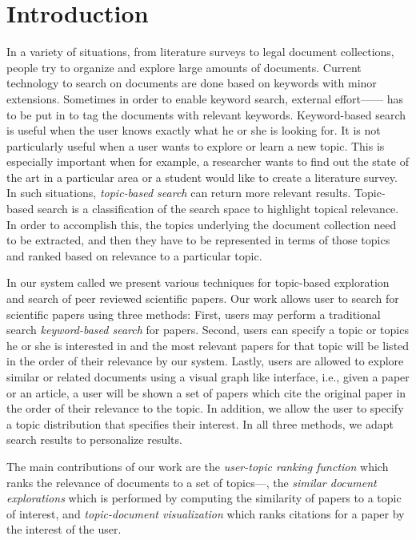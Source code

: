 \section{Introduction}

In a variety of situations, from literature surveys to legal 
document collections, people try to organize and explore large 
amounts of documents. Current technology to search on documents are 
done based on keywords with minor extensions. Sometimes in order to 
enable keyword search, external effort------ has to be put in to tag the 
documents with relevant keywords. Keyword-based search is useful when the 
user knows exactly what he or she is looking for. It is not 
particularly useful when a user wants to explore or learn a new 
topic. This is especially important when for example, a researcher 
wants to find out the state of the art in a particular area or a 
student would like to create a literature survey. In such situations, 
\textsl{topic-based search} can return more relevant results. 
Topic-based search is a classification of the search space to 
highlight topical relevance. In order to accomplish this, the topics 
underlying the document collection need to be extracted, and then 
they have to be represented in terms of those topics and ranked 
based on relevance to a particular topic. 

In our system called 
\system we present various techniques for topic-based exploration 
and search of peer reviewed scientific papers. Our work allows user 
to search for scientific papers using three methods: First, users 
may perform a traditional search \textsl{keyword-based search} for 
papers. Second, users can specify a topic or topics he or she is 
interested in and the most relevant papers for that topic will be 
listed in the order of their relevance by our system. Lastly, users 
are allowed to explore similar or related documents using a visual 
graph like interface, i.e., given a paper or an article, a user will 
be shown a set of papers which cite the original paper in the order 
of their relevance to the topic. In addition, we allow the user to 
specify a topic distribution that specifies their interest. In all 
three methods, we adapt search results to personalize results.

The main contributions of our work are the \textit{user-topic ranking function} 
which ranks the relevance of documents to a set of topics---, the 
\textit{similar document explorations} which is performed by computing the 
similarity of papers to a topic of interest, and \textit{topic-document visualization} which 
ranks citations for a paper by the interest of the user.
